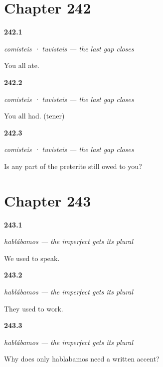 \section*{Chapter 242}

\noindent\begin{minipage}[t]{\linewidth}
\raggedright
\hypertarget{review-ES-C63-comisteis-er}{\textbf{242.1}} \emph{comisteis · tuvisteis — the last gap closes}\par
\small You all ate.
\end{minipage}\par\medskip

\noindent\begin{minipage}[t]{\linewidth}
\raggedright
\hypertarget{review-ES-C63-comisteis-strong}{\textbf{242.2}} \emph{comisteis · tuvisteis — the last gap closes}\par
\small You all had. (tener)
\end{minipage}\par\medskip

\noindent\begin{minipage}[t]{\linewidth}
\raggedright
\hypertarget{review-ES-C63-comisteis-done}{\textbf{242.3}} \emph{comisteis · tuvisteis — the last gap closes}\par
\small Is any part of the preterite still owed to you?
\end{minipage}\par\medskip

\section*{Chapter 243}

\noindent\begin{minipage}[t]{\linewidth}
\raggedright
\hypertarget{review-ES-C63-hablabamos-we}{\textbf{243.1}} \emph{hablábamos — the imperfect gets its plural}\par
\small We used to speak.
\end{minipage}\par\medskip

\noindent\begin{minipage}[t]{\linewidth}
\raggedright
\hypertarget{review-ES-C63-hablabamos-they}{\textbf{243.2}} \emph{hablábamos — the imperfect gets its plural}\par
\small They used to work.
\end{minipage}\par\medskip

\noindent\begin{minipage}[t]{\linewidth}
\raggedright
\hypertarget{review-ES-C63-hablabamos-accent}{\textbf{243.3}} \emph{hablábamos — the imperfect gets its plural}\par
\small Why does only hablabamos need a written accent?
\end{minipage}\par\medskip

